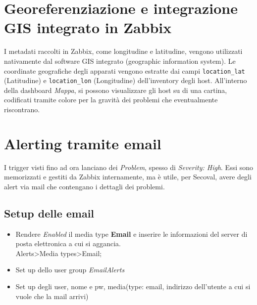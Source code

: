 \documentclass[12pt, a4paper]{report}
\begin{document}
\section{Georeferenziazione  e integrazione GIS integrato in Zabbix}
I metadati raccolti in Zabbix, come longitudine e latitudine, vengono utilizzati nativamente dal software GIS integrato (geographic information system).
Le coordinate geografiche degli apparati vengono estratte dai campi \texttt{location\_lat} (Latitudine) e \texttt{location\_lon} (Longitudine) dell'inventory degli host.
All'interno della dashboard \emph{Mappa}, si possono visualizzare gli host su di una cartina, codificati tramite colore per la gravità dei problemi che eventualmente riscontrano.

\section{Alerting tramite email}
I trigger visti fino ad ora lanciano dei \emph{Problem}, spesso di \emph{Severity: High}.
Essi sono memorizzati e gestiti da Zabbix internamente, ma è utile, per Secoval, avere degli alert via mail che contengano i dettagli dei problemi.

\subsection{Setup delle email}
\begin{itemize}
    \item Rendere \emph{Enabled} il media type \textbf{Email} e inserire le informazioni del server di posta elettronica a cui si aggancia. \\
        Alerts>Media types>Email;
    \item Set up dello user group \emph{EmailAlerts}
    \item Set up degli user, nome e pw, media(type: email, indirizzo dell'utente a cui si vuole che la mail arrivi)
\end{itemize}
\end{document}
